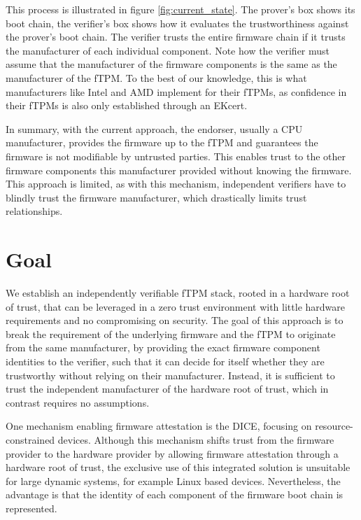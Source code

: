 

This process is illustrated in figure \autoref{fig:current_state}.
The prover's box shows its boot chain, the verifier's box shows how it evaluates the trustworthiness against the prover's boot chain.
The verifier trusts the entire firmware chain if it trusts the manufacturer of each individual component.
Note how the verifier must assume that the manufacturer of the firmware components is the same as the manufacturer of the fTPM\@.
To the best of our knowledge, this is what manufacturers like Intel and AMD implement for their \acp{fTPM}, as confidence in their \acp{fTPM} is also only established through an EKcert.


In summary, with the current approach, the endorser, usually a CPU manufacturer, provides the firmware up to the fTPM and guarantees the firmware is not modifiable by untrusted parties.
This enables trust to the other firmware components this manufacturer provided without knowing the firmware.
This approach is limited, as with this mechanism, independent verifiers have to blindly trust the firmware manufacturer, which drastically limits trust relationships.

\section{Goal}

We establish an independently verifiable fTPM stack, rooted in a hardware root of trust, that can be leveraged in a zero trust environment with little hardware requirements and no compromising on security.
The goal of this approach is to break the requirement of the underlying firmware and the fTPM to originate from the same manufacturer, by providing the exact firmware component identities to the verifier, such that it can decide for itself whether they are trustworthy without relying on their manufacturer.
Instead, it is sufficient to trust the independent manufacturer of the hardware root of trust, which in contrast requires no assumptions.


One mechanism enabling firmware attestation is the \ac{DICE}, focusing on resource-constrained devices.
Although this mechanism shifts trust from the firmware provider to the hardware provider by allowing firmware attestation through a hardware root of trust, the exclusive use of this integrated solution is unsuitable for large dynamic systems, for example Linux based devices.
Nevertheless, the advantage is that the identity of each component of the firmware boot chain is represented.

